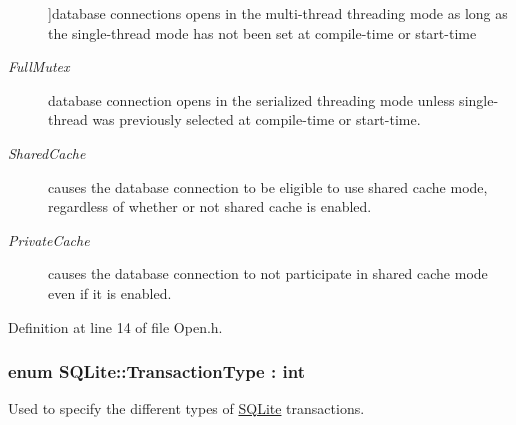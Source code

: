 \begin{Desc}
\begin{description}
{}]database connections opens in the multi-\/thread threading mode as long as the single-\/thread mode has not been set at compile-\/time or start-\/time \item[{\em 
\hypertarget{a00038_a0d8721ab00cfcf85ba4eed715ccfececa3322fce9aa781563c086ffd3c13da8b4}{Full\-Mutex}\label{a00038_a0d8721ab00cfcf85ba4eed715ccfececa3322fce9aa781563c086ffd3c13da8b4}
}]database connection opens in the serialized threading mode unless single-\/thread was previously selected at compile-\/time or start-\/time. \item[{\em 
\hypertarget{a00038_a0d8721ab00cfcf85ba4eed715ccfececadd8141c2dbba4f369c304f748a6badf6}{Shared\-Cache}\label{a00038_a0d8721ab00cfcf85ba4eed715ccfececadd8141c2dbba4f369c304f748a6badf6}
}]causes the database connection to be eligible to use shared cache mode, regardless of whether or not shared cache is enabled. \item[{\em 
\hypertarget{a00038_a0d8721ab00cfcf85ba4eed715ccfececa54f0a906e1d7cbe43867c40793c22c91}{Private\-Cache}\label{a00038_a0d8721ab00cfcf85ba4eed715ccfececa54f0a906e1d7cbe43867c40793c22c91}
}]causes the database connection to not participate in shared cache mode even if it is enabled. \end{description}
\end{Desc}


Definition at line 14 of file Open.\-h.

\hypertarget{a00038_af94f2dd6dcae8699eada7a0382e48e66}{
\subsubsection[{Transaction\-Type}]{\setlength{\rightskip}{0pt plus 5cm}enum {\bf S\-Q\-Lite\-::\-Transaction\-Type} \-: int\hspace{0.3cm}{\ttfamily [strong]}}}\label{a00038_af94f2dd6dcae8699eada7a0382e48e66}


Used to specify the different types of \hyperlink{a00038}{S\-Q\-Lite} transactions. 

